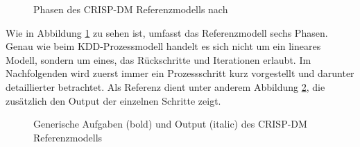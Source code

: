 \begin{figure}[H]
\caption{Phasen des CRISP-DM Referenzmodells nach \citep[S.~10]{chapman_crisp-dm_2000}}
\label{fig:CRISP_DM}
\centering
\end{figure}

Wie in Abbildung \ref{fig:CRISP_DM} zu sehen ist, umfasst das Referenzmodell sechs Phasen. Genau wie beim KDD-Prozessmodell handelt es sich nicht um ein lineares Modell, sondern um eines, das Rückschritte und Iterationen erlaubt. Im Nachfolgenden wird zuerst immer ein Prozessschritt kurz vorgestellt und darunter detaillierter betrachtet. Als Referenz dient unter anderem Abbildung \ref{fig:CRISP_DM_detailed}, die zusätzlich den Output der einzelnen Schritte zeigt.

\begin{figure}[H]
\caption{Generische Aufgaben (bold) und Output (italic) des CRISP-DM Referenzmodells \citep[S.~12]{chapman_crisp-dm_2000}}
\label{fig:CRISP_DM_detailed}
\centering
\end{figure}

